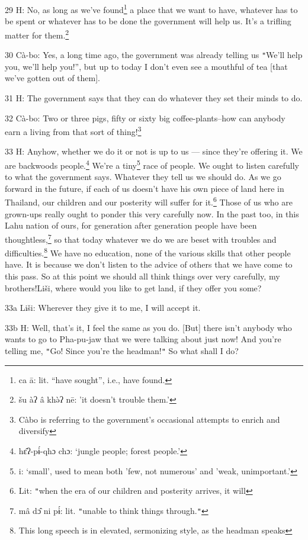 29 H: No, as long as we've found\footnote{ca ā: lit. ``have sought'', i.e., have found.} a place that we want to have, whatever has
to be spent or whatever has to be done the government will help us. It's a trifling
matter for them.\footnote{šu àʔ â khə̀ʔ nē: 'it doesn't trouble them.'}

30 Cà-bo: Yes, a long time ago, the government was already telling us \texttt{"}We'll
help you, we'll help you!'', but up to today I don't even see a mouthful of tea
[that we've gotten out of them].

31 H: The government says that they can do whatever they set their minds to do.

32 Cà-bo: Two or three pigs, fifty or sixty big coffee-plants--how can anybody
earn a living from that sort of thing!\footnote{Càbo is referring to the government's occasional attempts to enrich and diversify}

33 H: Anyhow, whether we do it or not is up to us --- since they're offering it.
We are backwoods people.\footnote{hɛ̂ʔ-pɨ́-qhɔ chɔ: `jungle people; forest people.'} We're a tiny\footnote{i: `small', used to mean both 'few, not numerous' and 'weak, unimportant.'} race of people. We ought to listen
carefully to what the government says. Whatever they tell us we should do. As we
go forward in the future, if each of us doesn't have his own piece of land here
in Thailand, our children and our posterity will suffer for it.\footnote{Lit: \texttt{"}when the era of our children and posterity arrives, it will} Those of us
who are grown-ups really ought to ponder this very carefully now. In the past too,
in this Lahu nation of ours, for generation after generation people have been thoughtless,\footnote{mâ dɔ̂ ni pɨ́: lit. \texttt{"}unable to think things through.\texttt{"}}
so that today whatever we do we are beset with troubles and difficulties.\footnote{This long speech is in elevated, sermonizing style, as the headman speaks} We
have no education, none of the various skills that other people have. It is because
we don't listen to the advice of others that we have come to this pass. So at this
point we should all think things over very carefully, my brothers!Liši, where
would you like to get land, if they offer you some?

33a Liši: Wherever they give it to me, I will accept it.

33b H: Well, that's it, I feel the same as you do. [But] there isn't anybody who
wants to go to Pha-pu-jaw that we were talking about just now! And you're telling
me, \texttt{"}Go! Since you're the headman!\texttt{"} So what shall I do?

